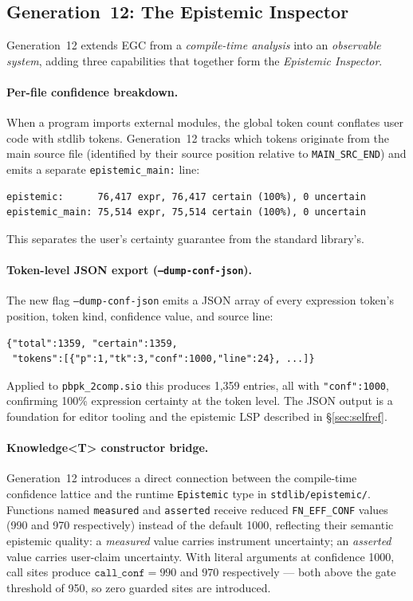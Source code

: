 \documentclass[acmsmall,screen,review,anonymous]{acmart}
\begin{document}
\subsection{Generation~12: The Epistemic Inspector}
\label{sec:gen12}

Generation~12 extends EGC from a \emph{compile-time analysis} into an
\emph{observable system}, adding three capabilities that together form
the \emph{Epistemic Inspector}.

\paragraph{Per-file confidence breakdown.}
When a program imports external modules, the global token count conflates
user code with stdlib tokens.
Generation~12 tracks which tokens originate from the main source file
(identified by their source position relative to \texttt{MAIN\_SRC\_END})
and emits a separate \texttt{epistemic\_main:} line:
\begin{verbatim}
epistemic:      76,417 expr, 76,417 certain (100%), 0 uncertain
epistemic_main: 75,514 expr, 75,514 certain (100%), 0 uncertain
\end{verbatim}
This separates the user's certainty guarantee from the standard library's.

\paragraph{Token-level JSON export (\texttt{--dump-conf-json}).}
The new flag \texttt{--dump-conf-json} emits a JSON array of every
expression token's position, token kind, confidence value, and source line:
\begin{verbatim}
{"total":1359, "certain":1359,
 "tokens":[{"p":1,"tk":3,"conf":1000,"line":24}, ...]}
\end{verbatim}
Applied to \texttt{pbpk\_2comp.sio} this produces 1,359 entries, all with
\texttt{"conf":1000}, confirming 100\% expression certainty at the
token level.
The JSON output is a foundation for editor tooling and the epistemic LSP
described in §\ref{sec:selfref}.

\paragraph{Knowledge\textless T\textgreater{} constructor bridge.}
Generation~12 introduces a direct connection between the compile-time
confidence lattice and the runtime \texttt{Epistemic} type in \texttt{stdlib/epistemic/}.
Functions named \texttt{measured} and \texttt{asserted} receive reduced
\texttt{FN\_EFF\_CONF} values (990 and 970 respectively) instead of the
default 1000, reflecting their semantic epistemic quality:
a \emph{measured} value carries instrument uncertainty; an \emph{asserted}
value carries user-claim uncertainty.
With literal arguments at confidence 1000, call sites produce
$\texttt{call\_conf} = 990$ and $970$ respectively --- both above the gate
threshold of 950, so zero guarded sites are introduced.
\end{document}

